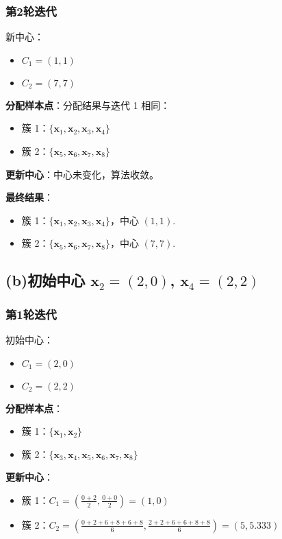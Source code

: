 \documentclass{article}
\begin{document}
\subsubsection*{第2轮迭代}
新中心：
\begin{itemize}
    \item \( C_1 = (1, 1) \)
    \item \( C_2 = (7, 7) \)
\end{itemize}
\textbf{分配样本点}：分配结果与迭代 1 相同：
\begin{itemize}
    \item 簇 1：\( \{ \mathbf{x}_1, \mathbf{x}_2, \mathbf{x}_3, \mathbf{x}_4 \} \)
    \item 簇 2：\( \{ \mathbf{x}_5, \mathbf{x}_6, \mathbf{x}_7, \mathbf{x}_8 \} \)
\end{itemize}
\textbf{更新中心}：中心未变化，算法收敛。

\textbf{最终结果}：
\begin{itemize}
    \item 簇 1：\( \{ \mathbf{x}_1, \mathbf{x}_2, \mathbf{x}_3, \mathbf{x}_4 \} \)，中心 \( (1, 1) \).
    \item 簇 2：\( \{ \mathbf{x}_5, \mathbf{x}_6, \mathbf{x}_7, \mathbf{x}_8 \} \)，中心 \( (7, 7) \).
\end{itemize}

\subsection*{(b)初始中心 \( \mathbf{x}_2 = (2, 0) \), \( \mathbf{x}_4 = (2, 2) \)}
\subsubsection*{第1轮迭代}
初始中心：
\begin{itemize}
    \item \( C_1 = (2, 0) \)
    \item \( C_2 = (2, 2) \)
\end{itemize}
\textbf{分配样本点}：
\begin{itemize}
    \item 簇 1：\( \{ \mathbf{x}_1, \mathbf{x}_2 \} \)
    \item 簇 2：\( \{ \mathbf{x}_3, \mathbf{x}_4, \mathbf{x}_5, \mathbf{x}_6, \mathbf{x}_7, \mathbf{x}_8 \} \)
\end{itemize}
\textbf{更新中心}：
\begin{itemize}
    \item 簇 1：\( C_1 = \left( \frac{0+2}{2}, \frac{0+0}{2} \right) = (1, 0) \)
    \item 簇 2：\( C_2 = \left( \frac{0+2+6+8+6+8}{6}, \frac{2+2+6+6+8+8}{6} \right) = (5, 5.333) \)
\end{itemize}
\end{document}
